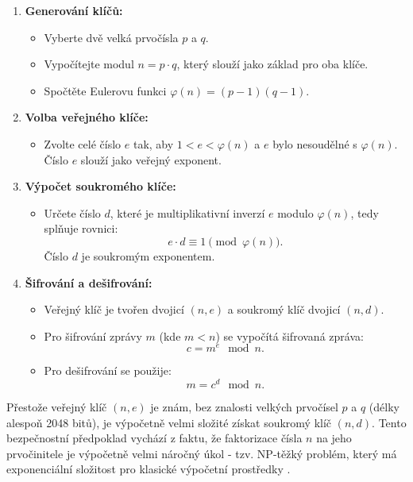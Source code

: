 \begin{enumerate}
    \item \textbf{Generování klíčů:}
      \begin{itemize}
        \item Vyberte dvě velká prvočísla \( p \) a \( q \).
        \item Vypočítejte modul \( n = p \cdot q \), který slouží jako základ pro oba klíče.
        \item Spočtěte Eulerovu funkci \(\varphi(n) = (p-1)(q-1)\).
      \end{itemize}
  
    \item \textbf{Volba veřejného klíče:}
      \begin{itemize}
        \item Zvolte celé číslo \( e \) tak, aby \( 1 < e < \varphi(n) \) a \( e \) bylo nesoudělné s \(\varphi(n)\). Číslo \( e \) slouží jako veřejný exponent.
      \end{itemize}
    
    \item \textbf{Výpočet soukromého klíče:}
      \begin{itemize}
        \item Určete číslo \( d \), které je multiplikativní inverzí \( e \) modulo \(\varphi(n)\), tedy splňuje rovnici:
        \[
        e \cdot d \equiv 1 \pmod{\varphi(n)}.
        \]
        Číslo \( d \) je soukromým exponentem.
      \end{itemize}
    
    \item \textbf{Šifrování a dešifrování:}
      \begin{itemize}
        \item Veřejný klíč je tvořen dvojicí \((n, e)\) a soukromý klíč dvojicí \((n, d)\).
        \item Pro šifrování zprávy \( m \) (kde \( m < n \)) se vypočítá šifrovaná zpráva:
        \[
        c = m^e \mod n.
        \]
        \item Pro dešifrování se použije:
        \[
        m = c^d \mod n.
        \]
      \end{itemize}
  \end{enumerate}

Přestože veřejný klíč \((n, e)\) je znám, bez znalosti velkých prvočísel \( p \) a \( q \) (délky alespoň 2048 bitů), je výpočetně velmi složité získat soukromý klíč \((n, d)\). Tento bezpečnostní předpoklad vychází z faktu, že faktorizace čísla \( n \) na jeho prvočinitele je výpočetně velmi náročný úkol - tzv. NP-těžký problém, který má exponenciální složitost pro klasické výpočetní prostředky \parencite{tesar2021}.  

